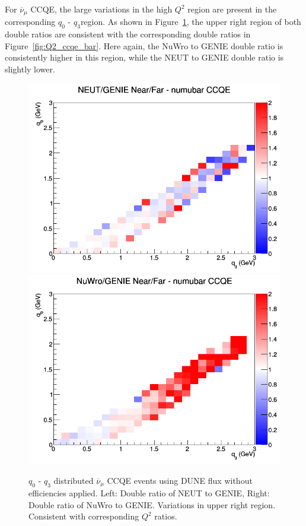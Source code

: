 \documentclass[12pt]{article}
\begin{document}
For $\overline{\nu}_{\mu}$ CCQE, the large variations in the high $Q^2$ region are present in the corresponding $q_0 \textrm{ - } q_3$region. As shown in Figure~\ref{fig:q0q3_numubar_CCQE_no_eff}, the upper right region of both double ratios are consistent with the corresponding double ratios in Figure~\ref{fig:Q2_ccqe_bar}. Here again, the NuWro to GENIE double ratio is consistently higher in this region, while the NEUT to GENIE double ratio is slightly lower.

\begin{figure}[h]
\centering
{}
\includegraphics[width=\linewidth]{q0_q3/nominal/ratios/CCQE_NEUT_GENIE_numubar_NF_q3_q0.png}
\endminipage
{}
\includegraphics[width=\linewidth]{q0_q3/nominal/ratios/CCQE_NuWro_GENIE_numubar_NF_q3_q0.png}
\endminipage
\caption{$q_0 \textrm{ - } q_3$ distributed $\overline{\nu}_{\mu}$ CCQE events using DUNE flux without efficiencies applied. Left: Double ratio of NEUT to GENIE, Right: Double ratio of NuWro to GENIE. Variations in upper right region. Consistent with corresponding $Q^2$ ratios.}
\label{fig:q0q3_numubar_CCQE_no_eff}
\end{figure}
\FloatBarrier
\end{document}
